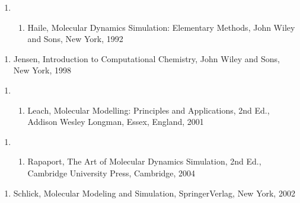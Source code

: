 \documentclass[letterpaper,11pt,english]{sphinxmanual}
\begin{document}
\begin{enumerate}
%
\setcounter{enumi}{9}
\item {} \begin{enumerate}
%
\setcounter{enumii}{12}
\item {} 
Haile, Molecular Dynamics Simulation: Elementary Methods, John Wiley and Sons, New York, 1992

\end{enumerate}

\end{enumerate}
\begin{enumerate}
%
\setcounter{enumi}{5}
\item {} 
Jensen, Introduction to Computational Chemistry, John Wiley and Sons, New York, 1998

\end{enumerate}
\begin{enumerate}
%
\item {} \begin{enumerate}
%
\setcounter{enumii}{17}
\item {} 
Leach, Molecular Modelling: Principles and Applications, 2nd Ed., Addison Wesley Longman, Essex, England, 2001

\end{enumerate}

\end{enumerate}
\begin{enumerate}
%
\setcounter{enumi}{3}
\item {} \begin{enumerate}
%
\setcounter{enumii}{2}
\item {} 
Rapaport, The Art of Molecular Dynamics Simulation, 2nd Ed., Cambridge University Press, Cambridge, 2004

\end{enumerate}

\end{enumerate}
\begin{enumerate}
%
\setcounter{enumi}{19}
\item {} 
Schlick, Molecular Modeling and Simulation, Springer\sphinxhyphen{}Verlag, New York, 2002

\end{enumerate}
\end{document}
